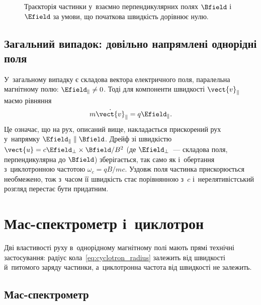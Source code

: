 \begin{figure}[h!]
	\centering
	\caption{Траєкторія частинки у~взаємно перпендикулярних полях $\Bfield$ і~$\Efield$ за умови, що початкова швидкість дорівнює нулю.}
	\label{tikz:drift_cycloide}
\end{figure}


\subsection*{Загальний випадок: довільно напрямлені однорідні поля}


У~загальному випадку є складова вектора електричного поля, паралельна магнітному полю: $\Efield_{\parallel} \neq 0$. Тоді для компоненти швидкості $\vect{v}_{\parallel}$ маємо рівняння
\begin{equation}\label{eq:v_parallel_general}
	m\dot{\vect{v}}_{\parallel} = q\Efield_{\parallel}.
\end{equation}
Це означає, що на рух, описаний вище, накладається прискорений рух у~напрямку $\Efield_{\parallel} \parallel \Bfield$. Дрейф зі швидкістю $\vect{u} = c\Efield_{\perp} \times \Bfield/B^2$ (де $\Efield_{\perp}$~--- складова поля, перпендикулярна до $\Bfield$) зберігається, так само як і~обертання з~циклотронною частотою $\omega_c = qB/mc$. Уздовж поля частинка прискорюється необмежено, тож з~часом її швидкість стає порівнянною з~$c$ і~нерелятивістський розгляд перестає бути придатним.


\section{Мас-спектрометр і~циклотрон}\hypertarget{mass-spectrometer-cyclotron}{}

Дві властивості руху в~однорідному магнітному полі мають прямі технічні застосування: радіус кола~\eqref{eq:cyclotron_radius}
залежить від швидкості й~питомого заряду частинки, а~циклотронна частота від швидкості не залежить.


\subsection*{Мас-спектрометр}


